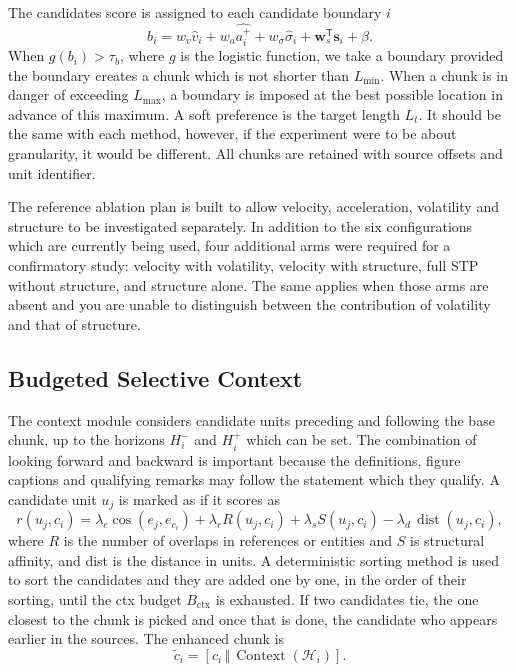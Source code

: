 \documentclass[10pt,a4paper]{article}
\begin{document}
The candidates score is assigned to each candidate boundary $i$
\begin{equation}
b_i=w_v\hat v_i+w_a\widehat{a_i^+}+w_\sigma\hat\sigma_i+
\mathbf{w}_s^{\mathsf T}\mathbf{s}_i+\beta.
\label{eq:boundary}
\end{equation}
When $g(b_i)>\tau_b$, where $g$ is the logistic function, we take a boundary provided the boundary creates a chunk which is not shorter than $L_{\min}$. When a chunk is in danger of exceeding $L_{\max}$, a boundary is imposed at the best possible location in advance of this maximum. A soft preference is the target length $L_t$. It should be the same with each method, however, if the experiment were to be about granularity, it would be different. All chunks are retained with source offsets and unit identifier.

The reference ablation plan is built to allow velocity, acceleration, volatility and structure to be investigated separately. In addition to the six configurations which are currently being used, four additional arms were required for a confirmatory study: velocity with volatility, velocity with structure, full STP without structure, and structure alone. The same applies when those arms are absent and you are unable to distinguish between the contribution of volatility and that of structure.

\subsection{Budgeted Selective Context}

The context module considers candidate units preceding and following the base chunk, up to the horizons $H^-_i$ and $H^+_i$ which can be set. The combination of looking forward and backward is important because the definitions, figure captions and qualifying remarks may follow the statement which they qualify. A candidate unit $u_j$ is marked as if it scores as
\begin{equation}
r(u_j,c_i)=\lambda_e\cos(e_j,e_{c_i})+\lambda_r R(u_j,c_i)
+\lambda_s S(u_j,c_i)-\lambda_d\,\operatorname{dist}(u_j,c_i),
\label{eq:contextscore}
\end{equation}
where $R$ is the number of overlaps in references or entities and $S$ is structural affinity, and dist is the distance in units. A deterministic sorting method is used to sort the candidates and they are added one by one, in the order of their sorting, until the ctx budget $B_{\mathrm{ctx}}$ is exhausted. If two candidates tie, the one closest to the chunk is picked and once that is done, the candidate who appears earlier in the sources. The enhanced chunk is
\begin{equation}
\tilde c_i=[c_i\,\Vert\,\operatorname{Context}(\mathcal H_i)].
\end{equation}
\end{document}
